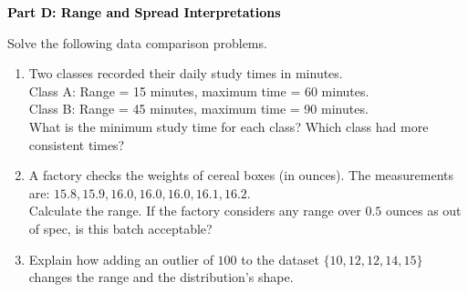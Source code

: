 \documentclass[12pt, letterpaper, fleqn]{article}
\begin{document}
\newpage

\begin{tcolorbox}[colback=black!10]
    \large\textcolor{black}{\textbf{Part D: Range and Spread Interpretations}}
\end{tcolorbox}

\vspace{3mm}

\noindent
Solve the following data comparison problems.

\vspace{5mm}

\begin{enumerate}[itemsep=2.5cm, leftmargin=0.6cm]
\item Two classes recorded their daily study times in minutes. \\
Class A: Range = 15 minutes, maximum time = 60 minutes. \\
Class B: Range = 45 minutes, maximum time = 90 minutes. \\
What is the minimum study time for each class? Which class had more consistent times?
\vspace{1cm}

\item A factory checks the weights of cereal boxes (in ounces). The measurements are: $15.8, 15.9, 16.0, 16.0, 16.0, 16.1, 16.2$. \\
Calculate the range. If the factory considers any range over $0.5$ ounces as out of spec, is this batch acceptable?
\vspace{1cm}

\item Explain how adding an outlier of $100$ to the dataset $\{10, 12, 12, 14, 15\}$ changes the range and the distribution's shape.
\end{enumerate}
\end{document}
